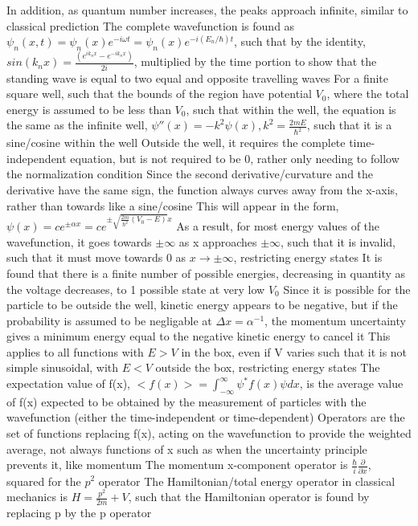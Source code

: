 \documentclass[11 pt, twoside]{article}
\newenvironment{outline*}
{
	\begin{outline}[enumerate]
	}
	{\end{outline}
}
\begin{document}
\begin{outline*}
		\3 In addition, as quantum number increases, the peaks approach infinite, similar to classical prediction
	\2 The complete wavefunction is found as $\psi_n(x, t) = \psi_n(x)e^{-i\omega t} = \psi_n(x)e^{-i(E_n/\hbar)t}$, such that by the identity, $sin(k_n x) = \frac{(e^{ik_nx} - e^{-ik_nx})}{2i}$, multiplied by the time portion to show that the standing wave is equal to two equal and opposite travelling waves
\1 For a finite square well, such that the bounds of the region have potential $V_0$, where the total energy is assumed to be less than $V_0$, such that within the well, the equation is the same as the infinite well, $\psi''(x) = -k^2\psi(x), k^2 = \frac{2mE}{\hbar^2}$, such that it is a sine/cosine within the well
	\2 Outside the well, it requires the complete time-independent equation, but is not required to be 0, rather only needing to follow the normalization condition
	\2 Since the second derivative/curvature and the derivative have the same sign, the function always curves away from the x-axis, rather than towards like a sine/cosine
		\3 This will appear in the form, $\psi(x) = ce^{\pm\alpha x} = ce^{\pm\sqrt{\frac{2m}{\hbar^2}(V_0 - E)}x}$
		\3 As a result, for most energy values of the wavefunction, it goes towards $\pm \infty$ as x approaches $\pm \infty$, such that it is invalid, such that it must move towards 0 as $x \to \pm \infty$, restricting energy states
		\3 It is found that there is a finite number of possible energies, decreasing in quantity as the voltage decreases, to 1 possible state at very low $V_0$
	\2 Since it is possible for the particle to be outside the well, kinetic energy appears to be negative, but if the probability is assumed to be negligable at $\Delta x = \alpha^{-1}$, the momentum uncertainty gives a minimum energy equal to the negative kinetic energy to cancel it
	\2 This applies to all functions with $E > V$ in the box, even if V varies such that it is not simple sinusoidal, with $E < V$ outside the box, restricting energy states
\1 The expectation value of f(x), $<f(x)> = \int^{\infty}_{-\infty} \psi^*f(x)\psi dx$, is the average value of f(x) expected to be obtained by the measurement of particles with the wavefunction (either the time-independent or time-dependent)
	\2 Operators are the set of functions replacing f(x), acting on the wavefunction to provide the weighted average, not always functions of x such as when the uncertainty principle prevents it, like momentum
		\3 The momentum x-component operator is $\frac{\hbar}{i}\frac{\partial}{\partial x}$, squared for the $p^2$ operator
		\3 The Hamiltonian/total energy operator in classical mechanics is $H = \frac{p^2}{2m} + V$, such that the Hamiltonian operator is found by replacing p by the p operator

\end{outline*}
\end{document}
